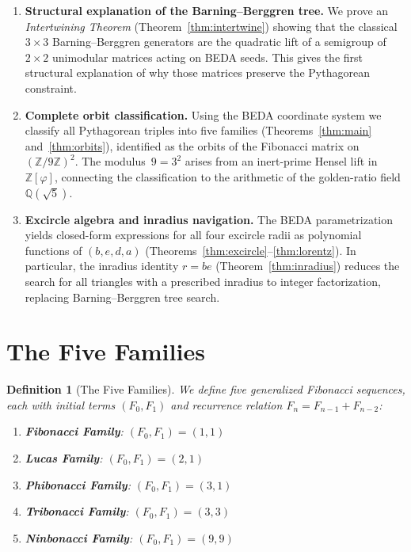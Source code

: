\documentclass[12pt]{article}
\newtheorem{definition}{Definition}
\begin{document}
\begin{enumerate}
\item \textbf{Structural explanation of the Barning--Berggren tree.}
We prove an \emph{Intertwining Theorem} (Theorem~\ref{thm:intertwine}) showing
that the classical $3\times3$ Barning--Berggren generators are the quadratic lift
of a semigroup of $2\times2$ unimodular matrices acting on BEDA seeds.  This
gives the first structural explanation of why those matrices preserve the
Pythagorean constraint.

\item \textbf{Complete orbit classification.}
Using the BEDA coordinate system we classify all Pythagorean triples into five
families (Theorems~\ref{thm:main} and~\ref{thm:orbits}), identified as the orbits
of the Fibonacci matrix on $(\mathbb{Z}/9\mathbb{Z})^2$.  The modulus~$9 = 3^2$
arises from an inert-prime Hensel lift in~$\mathbb{Z}[\varphi]$, connecting the
classification to the arithmetic of the golden-ratio field $\mathbb{Q}(\sqrt{5})$.

\item \textbf{Excircle algebra and inradius navigation.}
The BEDA parametrization yields closed-form expressions for all four excircle
radii as polynomial functions of $(b,e,d,a)$ (Theorems~\ref{thm:excircle}--\ref{thm:lorentz}).
In particular, the inradius identity $r = be$ (Theorem~\ref{thm:inradius}) reduces
the search for all triangles with a prescribed inradius to integer factorization,
replacing Barning--Berggren tree search.
\end{enumerate}

\section{The Five Families}

\begin{definition}[The Five Families]
We define five generalized Fibonacci sequences, each with initial terms $(F_0, F_1)$ and recurrence relation $F_n = F_{n-1} + F_{n-2}$:

\begin{enumerate}
\item \textbf{Fibonacci Family}: $(F_0, F_1) = (1, 1)$
\item \textbf{Lucas Family}: $(F_0, F_1) = (2, 1)$
\item \textbf{Phibonacci Family}: $(F_0, F_1) = (3, 1)$
\item \textbf{Tribonacci Family}: $(F_0, F_1) = (3, 3)$
\item \textbf{Ninbonacci Family}: $(F_0, F_1) = (9, 9)$
\end{enumerate}
\end{definition}
\end{document}
